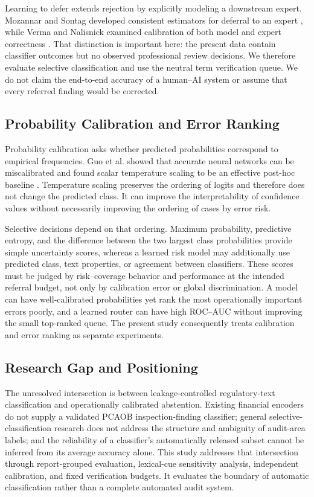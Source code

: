 \documentclass[11pt]{article}
\begin{document}
Learning to defer extends rejection by explicitly modeling a downstream expert.
Mozannar and Sontag developed consistent estimators for deferral to an expert
\cite{mozannar2020defer}, while Verma and Nalisnick examined calibration of both
model and expert correctness \cite{verma2022calibrated}. That distinction is
important here: the present data contain classifier outcomes but no observed
professional review decisions. We therefore evaluate selective classification
and use the neutral term verification queue. We do not claim the end-to-end
accuracy of a human--AI system or assume that every referred finding would be
corrected.

\subsection{Probability Calibration and Error Ranking}

Probability calibration asks whether predicted probabilities correspond to
empirical frequencies. Guo et al. showed that accurate neural networks can be
miscalibrated and found scalar temperature scaling to be an effective post-hoc
baseline \cite{guo2017calibration}. Temperature scaling preserves the ordering
of logits and therefore does not change the predicted class. It can improve the
interpretability of confidence values without necessarily improving the ordering
of cases by error risk.

Selective decisions depend on that ordering. Maximum probability, predictive
entropy, and the difference between the two largest class probabilities provide
simple uncertainty scores, whereas a learned risk model may additionally use
predicted class, text properties, or agreement between classifiers. These scores
must be judged by risk--coverage behavior and performance at the intended
referral budget, not only by calibration error or global discrimination. A model
can have well-calibrated probabilities yet rank the most operationally important
errors poorly, and a learned router can have high ROC--AUC without improving the
small top-ranked queue. The present study consequently treats calibration and
error ranking as separate experiments.

\subsection{Research Gap and Positioning}

The unresolved intersection is between leakage-controlled regulatory-text
classification and operationally calibrated abstention. Existing financial
encoders do not supply a validated PCAOB inspection-finding classifier; general
selective-classification research does not address the structure and ambiguity of
audit-area labels; and the reliability of a classifier's automatically released
subset cannot be inferred from its average accuracy alone. This study addresses
that intersection through report-grouped evaluation, lexical-cue sensitivity
analysis, independent calibration, and fixed verification budgets. It evaluates
the boundary of automatic classification rather than a complete automated audit
system.
\end{document}
